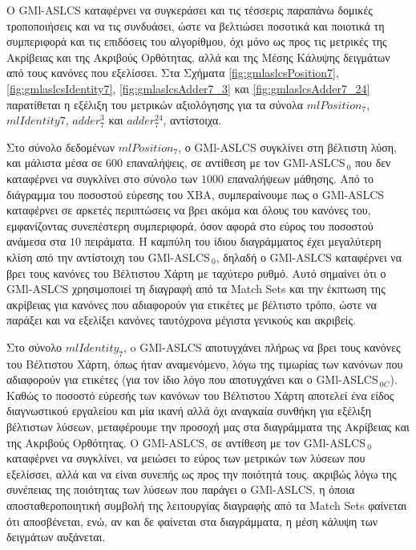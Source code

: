 Ο GMl-ASLCS καταφέρνει να συγκεράσει και τις τέσσερις παραπάνω δομικές τροποποιήσεις και να τις συνδυάσει, ώστε να βελτιώσει ποσοτικά και ποιοτικά τη συμπεριφορά και τις επιδόσεις του αλγορίθμου, όχι μόνο ως προς τις μετρικές της Ακρίβειας και της Ακριβούς Ορθότητας, αλλά και της Μέσης Κάλυψης δειγμάτων από τους κανόνες που εξελίσσει. Στα Σχήματα \ref{fig:gmlaslcsPosition7}, \ref{fig:gmlaslcsIdentity7}, \ref{fig:gmlaslcsAdder7_3} και \ref{fig:gmlaslcsAdder7_24} παρατίθεται η εξέλιξη του μετρικών αξιολόγησης για τα σύνολα $mlPosition_{7}$, $mlIdentity{7}$, $adder_{7}^{3}$ και $adder_{7}^{24}$, αντίστοιχα.

Στο σύνολο δεδομένων $mlPosition_{7}$, ο GMl-ASLCS συγκλίνει στη βέλτιστη λύση, και μάλιστα μέσα σε $600$ επαναλήψεις, σε αντίθεση με τον GMl-ASLCS$_{\:0}$ που δεν καταφέρνει να συγκλίνει στο σύνολο των $1000$ επαναλήψεων μάθησης. Από το διάγραμμα του ποσοστού εύρεσης του ΧΒΑ, συμπεραίνουμε πως ο GMl-ASLCS καταφέρνει σε αρκετές περιπτώσεις να βρει ακόμα και όλους του κανόνες του, εμφανίζοντας συνεπέστερη συμπεριφορά, όσον αφορά στο εύρος του ποσοστού ανάμεσα στα $10$ πειράματα. Η καμπύλη του ίδιου διαγράμματος έχει μεγαλύτερη κλίση από την αντίστοιχη του GMl-ASLCS$_{\:0}$, δηλαδή ο GMl-ASLCS καταφέρνει να βρει τους κανόνες του Βέλτιστου Χάρτη με ταχύτερο ρυθμό. Αυτό σημαίνει ότι ο GMl-ASLCS χρησιμοποιεί τη διαγραφή από τα Match Sets και την έκπτωση της ακρίβειας για κανόνες που αδιαφορούν για ετικέτες με βέλτιστο τρόπο, ώστε να παράξει και να εξελίξει κανόνες ταυτόχρονα μέγιστα γενικούς και ακριβείς.

Στο σύνολο $mlIdentity_{7}$, o GMl-ASLCS αποτυγχάνει πλήρως να βρει τους κανόνες του Βέλτιστου Χάρτη, όπως ήταν αναμενόμενο, λόγω της τιμωρίας των κανόνων που αδιαφορούν για ετικέτες (για τον ίδιο λόγο που αποτυγχάνει και ο GMl-ASLCS$_{\:0C}$). Καθώς το ποσοστό εύρεσής των κανόνων του Βέλτιστου Χάρτη αποτελεί ένα είδος διαγνωστικού εργαλείου και μία ικανή αλλά όχι αναγκαία συνθήκη για εξέλιξη βέλτιστων λύσεων, μεταφέρουμε την προσοχή μας στα διαγράμματα της Ακρίβειας και της Ακριβούς Ορθότητας. Ο GMl-ASLCS, σε αντίθεση με τον GMl-ASLCS$_{\:0}$ καταφέρνει να συγκλίνει, να μειώσει το εύρος των μετρικών των λύσεων που εξελίσσει, αλλά και να είναι συνεπής ως προς την ποιότητά τους. ακριβώς λόγω της συνέπειας της ποιότητας των λύσεων που παράγει ο GMl-ASLCS, η όποια αποσταθεροποιητική συμβολή της λειτουργίας διαγραφής από τα Match Sets φαίνεται ότι αποσβένεται, ενώ, αν και δε φαίνεται στα διαγράμματα, η μέση κάλυψη των δειγμάτων αυξάνεται.

